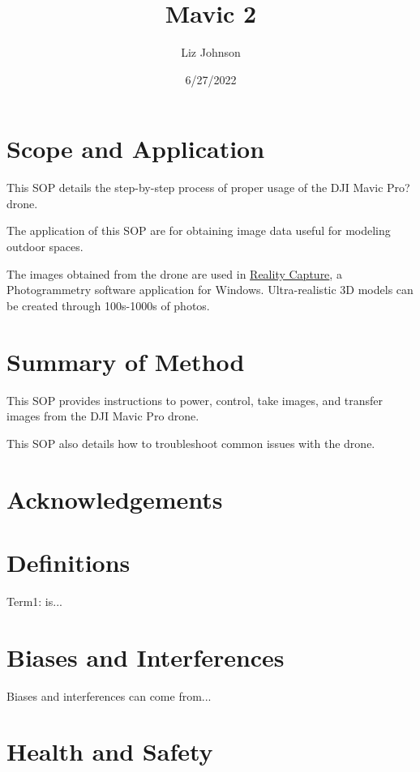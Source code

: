 \documentclass[12pt]{../SOP4_alpha}\usepackage[]{graphicx}\usepackage[]{color}
\title{Mavic 2}
\date{6/27/2022}
\author{Liz Johnson}
\begin{document}
\maketitle

\section{Scope and Application}

\NP This SOP details the step-by-step process of proper usage of the DJI Mavic Pro? drone.

\NP The application of this SOP are for obtaining image data useful for modeling outdoor spaces.

\NP The images obtained from the drone are used in \href{https://www.capturingreality.com/realitycapture}{Reality Capture}, a Photogrammetry software application for Windows. Ultra-realistic 3D models can be created through 100s-1000s of photos.

\section{Summary of Method}

\NP This SOP provides instructions to power, control, take images, and transfer images from the DJI Mavic Pro drone.

\NP This SOP also details how to troubleshoot common issues with the drone.

\tableofcontents

\newpage

\section{Acknowledgements}

\section{Definitions}

\NP Term1: is...

\section{Biases and Interferences}

\NP Biases and interferences can come from...

\section{Health and Safety}
\end{document}
